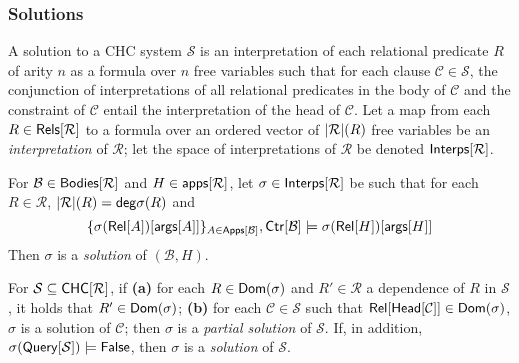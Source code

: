 \subsubsection{Solutions}
\label{sec:chc-solns}
%
A solution to a CHC system $\mathcal{S}$ is an interpretation of each
relational predicate $R$ of arity $n$ as a formula over $n$ free
variables such that for each clause $\mathcal{C} \in \mathcal{S}$, the
conjunction of interpretations of all relational predicates in the
body of $\mathcal{C}$ and the constraint of $\mathcal{C}$ entail the
interpretation of the head of $\mathcal{C}$.
%
Let a map from each $R \in \mathsf{Rels}[  \mathcal{R}  ]$ to a formula over
an ordered vector of $| \mathcal{R} |(R)$ free variables be an
\emph{interpretation} of $\mathcal{R}$;
%
let the space of interpretations of $\mathcal{R}$ be denoted
$\mathsf{Interps}[  \mathcal{R}  ]$.
%
\begin{defn}
  \label{defn:chc-soln}
  For $\mathcal{B} \in \mathsf{Bodies}[  \mathcal{R}  ]$ and $H \in \mathsf{apps}[ 
    \mathcal{R}  ]$, %
  let $\sigma \in \mathsf{Interps}[  \mathcal{R}  ]$ be such that for each $R
  \in \mathcal{R}$, $|\mathcal{R}|(R) = \mathsf{deg}{\sigma(R)}$
  and %
  \[ \elts{ \sigma(\relof{ A })[ \argsof{ A } ] }_{ A \in \appsof{
      \mathcal{B} } }, %
  \ctrof{ \mathcal{B} } \entails %
  \sigma( \relof{H} )[ \argsof{ H } ]
  \]
  Then $\sigma$ is a \emph{solution} of $(\mathcal{B}, H)$.
\end{defn}
For $\mathcal{S} \subseteq \mathsf{CHC}[  \mathcal{R}  ]$, if
\textbf{(a)} for each $R \in \mathsf{Dom}(\sigma)$ and $R' \in \mathcal{R}$
a dependence of $R$ in $\mathcal{S}$, it holds that $R' \in
\mathsf{Dom}(\sigma)$;
%
\textbf{(b)} for each $\mathcal{C} \in \mathcal{S}$ such that
$\mathsf{Rel}[  \mathsf{Head}[  \mathcal{C}  ]  ] \in \mathsf{Dom}(\sigma)$, $\sigma$ is a
solution of $\mathcal{C}$;
%
then $\sigma$ is a \emph{partial solution} of $\mathcal{S}$.
%
If, in addition, $\sigma(\mathsf{Query}[  \mathcal{S}  ]) \models \mathsf{False}$,
then $\sigma$ is a \emph{solution} of $\mathcal{S}$.
%


